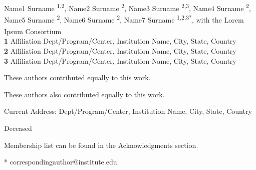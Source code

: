 \documentclass[10pt,letterpaper]{article} %
\begin{document}
\vspace*{0.2in}

\begin{flushleft}
{\Large
\textbf{} %
}
\newline
\\
Name1 Surname \textsuperscript{1,2\Yinyang},
Name2 Surname \textsuperscript{2\Yinyang},
Name3 Surname \textsuperscript{2,3\textcurrency},
Name4 Surname \textsuperscript{2},
Name5 Surname \textsuperscript{2\ddag},
Name6 Surname \textsuperscript{2\ddag},
Name7 Surname \textsuperscript{1,2,3*},
with the Lorem Ipsum Consortium\textsuperscript{\textpilcrow}
\\
\bigskip
\textbf{1} Affiliation Dept/Program/Center, Institution Name, City, State, Country
\\
\textbf{2} Affiliation Dept/Program/Center, Institution Name, City, State, Country
\\
\textbf{3} Affiliation Dept/Program/Center, Institution Name, City, State, Country
\\
\bigskip

% 
%
\Yinyang These authors contributed equally to this work.

\ddag These authors also contributed equally to this work.

\textcurrency Current Address: Dept/Program/Center, Institution Name, City, State, Country %

\dag Deceased

\textpilcrow Membership list can be found in the Acknowledgments section.

* correspondingauthor@institute.edu

\end{flushleft}
\end{document}
